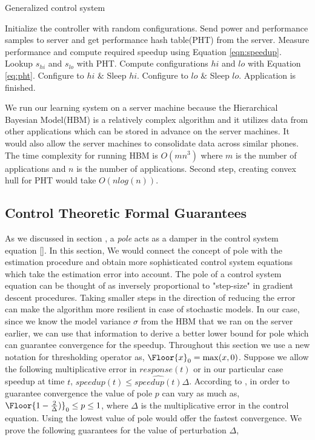 \begin{algorithm}
\caption{Generalized control system}
\begin{algorithmic}
\REQUIRE Initialize the controller with random configurations. Send power and performance samples to server and get performance hash table(PHT) from the server.
    \STATE    Measure performance and compute required speedup using Equation \eqref{eqn:speedup}.
    \STATE    Lookup $s_{hi}$ and $s_{lo}$ with PHT.
    \STATE    Compute configurations $hi$ and $lo$ with Equation \eqref{eq:pht}.
    \STATE    Configure to $hi$ $\&$ Sleep $hi$.
    \STATE    Configure to $lo$ $\&$ Sleep $lo$.
\ENDWHILE
\STATE Application is finished.
\end{algorithmic}
\end{algorithm}
We run our learning system on a server machine because the Hierarchical Bayesian Model(HBM) is a relatively complex algorithm and it utilizes data from other applications which can be stored in advance on the server machines. It would also allow the server machines to consolidate data across similar phones. The time complexity for running HBM is $O(mn^3)$ where $m$ is the number of applications and $n$ is the number of applications. Second step, creating convex hull for PHT would take $O(n log(n))$.  

\subsection{Control Theoretic Formal Guarantees}
\label{sec:guarantees}
As we discussed in section \secref{}, a \emph{pole} acts as a damper in the
control system equation \eqref{}. In this section, We would connect the concept
of pole with the estimation procedure and obtain more sophisticated control
system equations which take the estimation error into account.
The pole of a control system equation can be thought of as inversely proportional
to "step-size" in gradient descent procedures. Taking smaller steps in the direction of reducing the error can make the algorithm more resilient in case of stochastic models. In our case, since we know the model variance $\sigma$ from the HBM that we ran on the server earlier, we can use that information to derive a better lower bound for pole which can guarantee convergence for the speedup. %
Throughout this section we use a new notation for thresholding operator as, $\Floor{x}_0 = \max(x,0)$. Suppose we allow the following multiplicative error in $response(t)$ or in our
particular case speedup at time $t$, $speedup(t) \leq  \hat{speedup(t)} \Delta$.
According to \cite{}, in order to guarantee convergence the value of pole $p$ can vary as much as,
$\Floor{1-\frac{2}{\Delta})}_0\leq p \leq 1$, where $\Delta$ is the multiplicative
error in the control equation. Using the lowest value of pole would offer the
fastest convergence. We prove the following guarantees for the value of perturbation $\Delta$,

